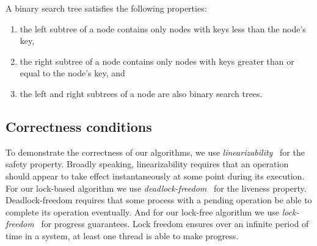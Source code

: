 A binary search tree satisfies the following properties:
\begin{enumerate}[label=(\alph*)]
\item the left subtree of a node contains only nodes with keys less than the node's key, 
\item the right subtree of a node contains only nodes with keys greater than or equal to the node's key, and
\item the left and right subtrees of a node are also binary search trees.
\end{enumerate}

\subsection{Correctness conditions}
To demonstrate the correctness of our algorithms, we use \emph{linearizability}~\cite{HerWin:1990:TOPLAS} for the safety property. Broadly speaking, linearizability requires that an operation should appear to take effect instantaneously at some point during its execution. For our lock-based algorithm we use \emph{deadlock-freedom}~\cite{HerSha:2012:Book} for the liveness property. Deadlock-freedom requires that some process with a pending operation be able to complete its operation eventually. And for our lock-free algorithm we use \emph{lock-freedom}~\cite{HerSha:2012:Book} for progress guarantees. Lock freedom ensures over an infinite period of time in a system, at least one thread is able to make progress.
